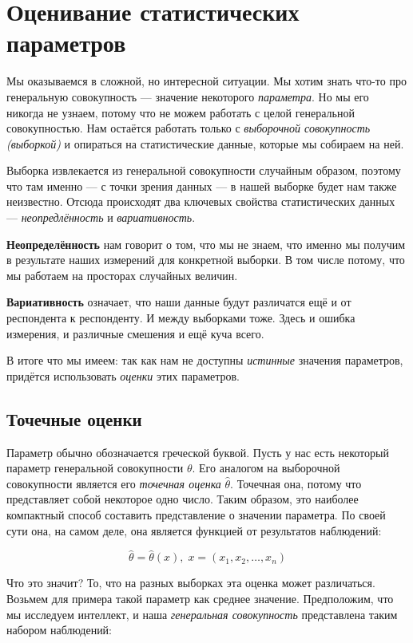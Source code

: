 \documentclass[
  letterpaper,
]{scrbook}
\theoremstyle{definition}
\theoremstyle{remark}
\begin{document}
\chapter{Оценивание статистических параметров}\label{stats-estim}

Мы оказываемся в сложной, но интересной ситуации. Мы хотим знать что-то
про генеральную совокупность --- значение некоторого \emph{параметра}.
Но мы его никогда не узнаем, потому что не можем работать с целой
генеральной совокупностью. Нам остаётся работать только с
\emph{выборочной совокупность (выборкой)} и опираться на статистические
данные, которые мы собираем на ней.

Выборка извлекается из генеральной совокупности случайным образом,
поэтому что там именно --- с точки зрения данных --- в нашей выборке
будет нам также неизвестно. Отсюда происходят два ключевых свойства
статистических данных --- \emph{неопредлённость} и \emph{вариативность}.

\textbf{Неопределённость} нам говорит о том, что мы не знаем, что именно
мы получим в результате наших измерений для конкретной выборки. В том
числе потому, что мы работаем на просторах случайных величин.

\textbf{Вариативность} означает, что наши данные будут различатся ещё и
от респондента к респонденту. И между выборками тоже. Здесь и ошибка
измерения, и различные смешения и ещё куча всего.

В итоге что мы имеем: так как нам не доступны \emph{истинные} значения
параметров, придётся использовать \emph{оценки} этих параметров.

\section{Точечные
оценки}\label{ux442ux43eux447ux435ux447ux43dux44bux435-ux43eux446ux435ux43dux43aux438}

Параметр обычно обозначается греческой буквой. Пусть у нас есть
некоторый параметр генеральной совокупности \(\theta\). Его аналогом на
выборочной совокупности является его \emph{точечная оценка}
\(\hat \theta\). Точечная она, потому что представляет собой некоторое
одно число. Таким образом, это наиболее компактный способ составить
представление о значении параметра. По своей сути она, на самом деле,
она является функцией от результатов наблюдений:

\[
\hat \theta = \hat \theta (x), \; x = (x_1, x_2, \dots, x_n)
\]

Что это значит? То, что на разных выборках эта оценка может различаться.
Возьмем для примера такой параметр как среднее значение. Предположим,
что мы исследуем интеллект, и наша \emph{генеральная совокупность}
представлена таким набором наблюдений:
\end{document}
